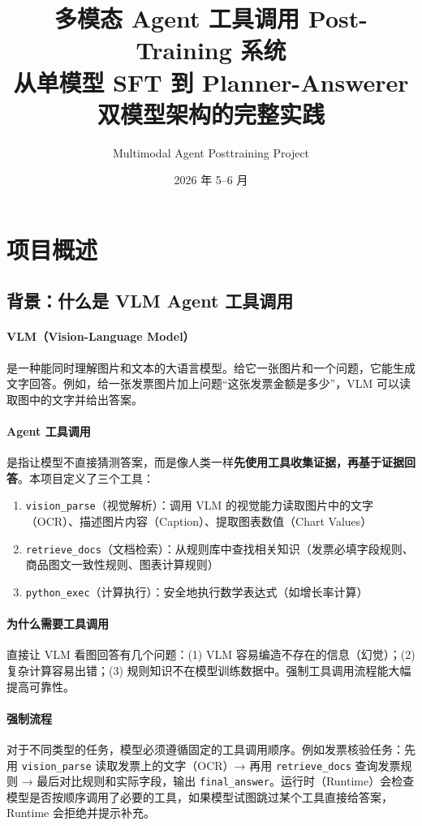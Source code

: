 \documentclass[12pt,a4paper]{ctexart}
\title{多模态 Agent 工具调用 Post-Training 系统\\
\large 从单模型 SFT 到 Planner-Answerer 双模型架构的完整实践}
\author{Multimodal Agent Posttraining Project}
\date{2026 年 5--6 月}
\begin{document}
\maketitle
\tableofcontents
\newpage

\section{项目概述}

\subsection{背景：什么是 VLM Agent 工具调用}

\paragraph{VLM（Vision-Language Model）}是一种能同时理解图片和文本的大语言模型。给它一张图片和一个问题，它能生成文字回答。例如，给一张发票图片加上问题``这张发票金额是多少''，VLM 可以读取图中的文字并给出答案。

\paragraph{Agent 工具调用}是指让模型不直接猜测答案，而是像人类一样\textbf{先使用工具收集证据，再基于证据回答}。本项目定义了三个工具：

\begin{enumerate}[nosep]
  \item \texttt{vision\_parse}（视觉解析）：调用 VLM 的视觉能力读取图片中的文字（OCR）、描述图片内容（Caption）、提取图表数值（Chart Values）
  \item \texttt{retrieve\_docs}（文档检索）：从规则库中查找相关知识（发票必填字段规则、商品图文一致性规则、图表计算规则）
  \item \texttt{python\_exec}（计算执行）：安全地执行数学表达式（如增长率计算）
\end{enumerate}

\paragraph{为什么需要工具调用}直接让 VLM 看图回答有几个问题：(1) VLM 容易编造不存在的信息（幻觉）；(2) 复杂计算容易出错；(3) 规则知识不在模型训练数据中。强制工具调用流程能大幅提高可靠性。

\paragraph{强制流程}对于不同类型的任务，模型必须遵循固定的工具调用顺序。例如发票核验任务：先用 \texttt{vision\_parse} 读取发票上的文字（OCR）→ 再用 \texttt{retrieve\_docs} 查询发票规则 → 最后对比规则和实际字段，输出 \texttt{final\_answer}。运行时（Runtime）会检查模型是否按顺序调用了必要的工具，如果模型试图跳过某个工具直接给答案，Runtime 会拒绝并提示补充。
\end{document}
